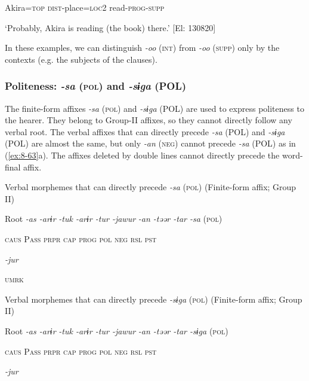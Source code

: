       Akira=\textsc{top}  \textsc{dist}-place=\textsc{loc}2  read-\textsc{prog}-\textsc{supp}

\glt ‘Probably, Akira is reading (the book) there.’ [El: 130820]

In these examples, we can distinguish \textit{{}-oo} (\textsc{int}) from \textit{{}-oo} (\textsc{supp}) only by the contexts (e.g. the subjects of the clauses).

\subsubsection{Politeness: \textit{{}-sa} (\textsc{pol}) and \textit{{}-sɨga} (POL)}

The finite-form affixes \textit{{}-sa} (\textsc{pol}) and \textit{{}-sɨga} (POL) are used to express politeness to the hearer. They belong to Group-II affixes, so they cannot directly follow any verbal root. The verbal affixes that can directly precede \textit{{}-sa} (POL) and \textit{{}-sɨga} (POL) are almost the same, but only \textit{{}-an} (\textsc{neg}) cannot precede \textit{{}-sa} (POL) as in (\ref{ex:8-63}a). The affixes deleted by double lines cannot directly precede the word-final affix.

\ea\label{ex:8-63}
\ea Verbal morphemes that can directly precede \textit{{}-sa} (\textsc{pol}) (Finite-form affix; Group II)

  Root  \textit{{}-as  {}-arɨr} %
\textit{{}-tuk  {}-arɨr  {}-tur  {}-jawur} %
\textit{{}-an  {}-təər  {}-tar  {}-sa} (\textsc{pol})

    \textsc{caus}  P\textsc{ass}  \textsc{prpr}  \textsc{cap}  \textsc{prog}  \textsc{pol}  \textsc{neg}  \textsc{rsl}  \textsc{pst}

          \textit{{}-jur} 

          \textsc{umrk}

\ex Verbal morphemes that can directly precede \textit{{}-sɨga} (\textsc{pol}) (Finite-form affix; Group II)

  Root  \textit{{}-as  {}-arɨr} %
\textit{{}-tuk  {}-arɨr  {}-tur  {}-jawur} %
\textit{{}-an  {}-təər  {}-tar  {}-sɨga} (\textsc{pol})

    \textsc{caus}  P\textsc{ass}  \textsc{prpr}  \textsc{cap}  \textsc{prog}  \textsc{pol}  \textsc{neg}  \textsc{rsl}  \textsc{pst}

          \textit{{}-jur} 

